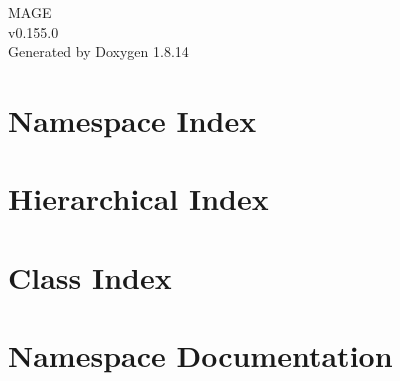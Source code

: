 \documentclass[twoside]{book}
\newcommand{\+}{\discretionary{\mbox{\scriptsize$\hookleftarrow$}}{}{}}
\newcommand{\clearemptydoublepage}{%
  \newpage{\pagestyle{empty}\cleardoublepage}%
}
\begin{document}
\hypersetup{pageanchor=false,
             bookmarksnumbered=true,
             pdfencoding=unicode
            }
\begin{titlepage}
\vspace*{7cm}
\begin{center}%
{\Large M\+A\+GE \\[1ex]\large v0.\+155.\+0 }\\
\vspace*{1cm}
{\large Generated by Doxygen 1.8.14}\\
\end{center}
\end{titlepage}
\clearemptydoublepage
{}
\tableofcontents
\clearemptydoublepage
{}
\hypersetup{pageanchor=true}

\chapter{Namespace Index}

\chapter{Hierarchical Index}

\chapter{Class Index}

\chapter{Namespace Documentation}










\end{document}
